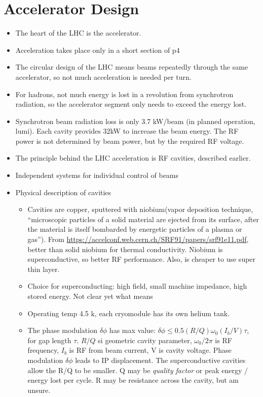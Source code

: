 \section{Accelerator Design}
\begin{itemize}
    \item The heart of the LHC is the accelerator.
    \item Acceleration takes place only in a short section of p4
    \item The circular design of the LHC means beams repeatedly through the same accelerator, so not much acceleration is needed per turn.
    \item For hadrons, not much energy is lost in a revolution from synchrotron radiation, so the accelerator segment only needs to exceed the energy lost.
    \item Synchrotron beam radiation loss is only 3.7 kW/beam (in planned operation, lumi). Each cavity provides 32kW to increase the beam energy. The RF power is not determined by beam power, but by the required RF voltage. \cite{boussard}
    \item The principle behind the LHC acceleration is RF cavities, described earlier.
    \item Independent systems for individual control of beams \cite{lyndon}
    \item Physical description of cavities
    \begin{itemize}\scriptsize
        \item Cavities are copper, sputtered with niobium(vapor deposition technique, ``microscopic particles of a solid material are ejected from its surface, after the material is itself bombarded by energetic particles of a plasma or gas''). {\color{blue} From \url{https://accelconf.web.cern.ch/SRF91/papers/srf91e11.pdf}, better than solid niobium for thermal conductivity. Niobium is superconductive, so better RF performance. Also, is cheaper to use super thin layer.} \cite{lyndon}
        \item Choice for superconducting: high field, small machine impedance, high stored energy. {\color{blue} Not clear yet what means} \cite{boussard}
        \item Operating temp 4.5 k, each cryomodule has its own helium tank. \cite{boussard}
        \item The phase modulation $\delta\phi$ has max value: $\delta\phi\le0.5(R/Q)\omega_0(I_b/V)\tau$, for gap length $\tau$. $R/Q$ si geometric cavity parameter, $\omega_0/2\pi$ is RF frequency, $I_b$ is RF from beam current, V is cavity voltage. Phase modulation $\delta\phi$ leads to IP displacement. The superconductive cavities allow the R/Q to be smaller. Q may be \emph{quality factor} or peak energy / energy lost per cycle. R may be resistance across the cavity, but am unsure. \cite{boussard}

\end{itemize}
\end{itemize}
